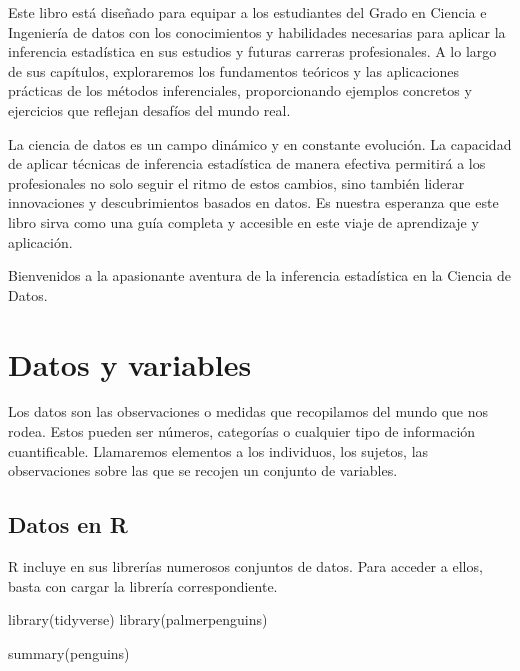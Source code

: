 \documentclass[
  letterpaper,
  DIV=11,
  numbers=noendperiod]{scrreprt}
\newenvironment{Shaded}{\begin{snugshade}}{\end{snugshade}}
\newcommand{\FunctionTok}[1]{\textcolor[rgb]{0.28,0.35,0.67}{#1}}
\newcommand{\NormalTok}[1]{\textcolor[rgb]{0.00,0.23,0.31}{#1}}
\begin{document}
Este libro está diseñado para equipar a los estudiantes del Grado en
Ciencia e Ingeniería de datos con los conocimientos y habilidades
necesarias para aplicar la inferencia estadística en sus estudios y
futuras carreras profesionales. A lo largo de sus capítulos,
exploraremos los fundamentos teóricos y las aplicaciones prácticas de
los métodos inferenciales, proporcionando ejemplos concretos y
ejercicios que reflejan desafíos del mundo real.

La ciencia de datos es un campo dinámico y en constante evolución. La
capacidad de aplicar técnicas de inferencia estadística de manera
efectiva permitirá a los profesionales no solo seguir el ritmo de estos
cambios, sino también liderar innovaciones y descubrimientos basados en
datos. Es nuestra esperanza que este libro sirva como una guía completa
y accesible en este viaje de aprendizaje y aplicación.

Bienvenidos a la apasionante aventura de la inferencia estadística en la
Ciencia de Datos.

\hypertarget{datos-y-variables}{%
\section{Datos y variables}\label{datos-y-variables}}

Los datos son las observaciones o medidas que recopilamos del mundo que
nos rodea. Estos pueden ser números, categorías o cualquier tipo de
información cuantificable. Llamaremos elementos a los individuos, los
sujetos, las observaciones sobre las que se recojen un conjunto de
variables.

\hypertarget{sec-datos}{%
\subsection{Datos en R}\label{sec-datos}}

R incluye en sus librerías numerosos conjuntos de datos. Para acceder a
ellos, basta con cargar la librería correspondiente.

\begin{Shaded}
\begin{Highlighting}[]
\FunctionTok{library}\NormalTok{(tidyverse)}
\FunctionTok{library}\NormalTok{(palmerpenguins)}

\FunctionTok{summary}\NormalTok{(penguins)}
\end{Highlighting}
\end{Shaded}
\end{document}

